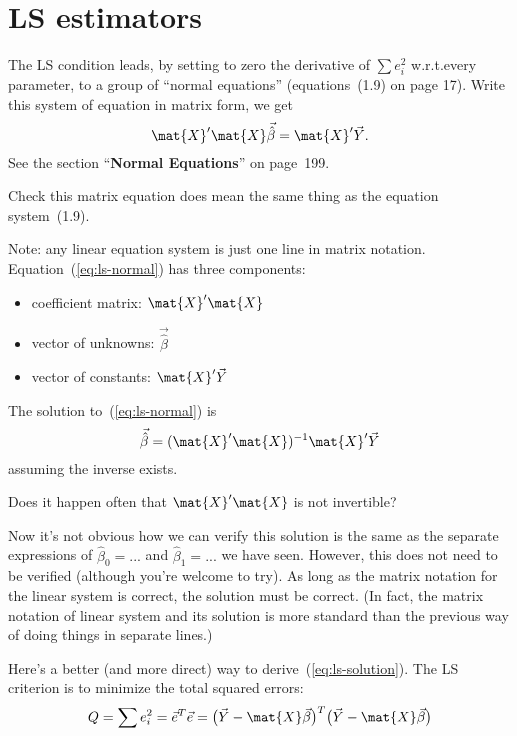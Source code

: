 \documentclass[12pt]{article}
\begin{document}
\section{LS estimators}

The LS condition leads,
by setting to zero the derivative of $\sum e_i^2$ w.r.t.\@ every
parameter,
to a group of ``normal equations''
(equations~(1.9) on page 17).
Write this system of equation in matrix form, we get
\begin{equation}\label{eq:ls-normal}
\mat{X}' \mat{X} \vec{\hat{\beta}} = \mat{X}' \vec{Y}
.
\end{equation}
See the section ``\textbf{Normal Equations}'' on page~199.

\exercise
Check this matrix equation does mean the same thing
as the equation system~(1.9).

Note: any linear equation system is just one line in matrix notation.
Equation~(\ref{eq:ls-normal}) has three components:
\begin{itemize}
\item coefficient matrix: $\mat{X}'\mat{X}$
\item vector of unknowns: $\vec{\hat\beta}$
\item vector of constants: $\mat{X}'\vec{Y}$
\end{itemize}

The solution to~(\ref{eq:ls-normal}) is
\begin{equation}\label{eq:ls-solution}
\vec{\hat\beta} = (\mat{X}'\mat{X})^{-1} \mat{X}'\vec{Y}
\end{equation}
assuming the inverse exists.

\alert[Q]%
Does it happen often that $\mat{X}'\mat{X}$ is not invertible?

Now it's not obvious how we can verify this solution is the same as the
separate expressions of
$\hat\beta_0 = ...$ and $\hat\beta_1 =...$ we have seen.
However, this does not need to be verified (although you're welcome to
try).
As long as the matrix notation for the linear system is correct,
the solution must be correct.
(In fact, the matrix notation of linear system and its solution is more
standard than the previous way of doing things in separate lines.)

Here's a better (and more direct) way to derive~(\ref{eq:ls-solution}).
The LS criterion is to minimize the total squared errors:
\begin{equation}\label{eq:ls-Q}
Q = \sum e_i^2
  = \vec{e}^T\vec{e}
  = \bigl(\vec{Y} - \mat{X}\vec{\beta}\bigr)^T
    \bigl(\vec{Y} - \mat{X}\vec{\beta}\bigr)
\end{equation}
\end{document}
